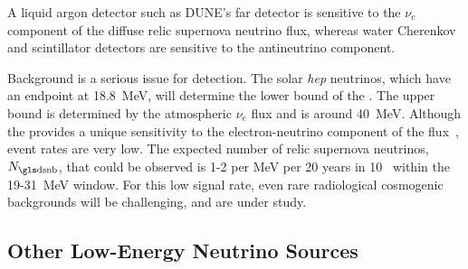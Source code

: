 A liquid argon detector such as DUNE's far detector is sensitive to
the $\nu_e$ component of the diffuse relic supernova neutrino flux,
whereas water Cherenkov and scintillator detectors are sensitive to
the antineutrino component.

Background is a serious issue for  detection.
The solar {\em hep} neutrinos, which have an                
endpoint at \SI{18.8}{\MeV}, will determine the lower bound of the .
The upper bound is determined
by the atmospheric ${\nu}_{e}$ flux and
is around \SI{40}{MeV}.
Although the  provides a unique sensitivity to the
electron-neutrino component of the 
flux~\cite{Cocco:2004ac}, event rates are very low.
%
The expected number of relic
supernova neutrinos, $N_{\rm \dword{dsnb}}$, that could be observed is
1-2 per MeV per 20 years in \SI{10}{\kt}~\cite{Moller2018kpm}
within the 19-31~MeV window.  For this low signal rate, even rare
radiological cosmogenic backgrounds will be challenging, and are
under study.


\subsection{Other Low-Energy Neutrino Sources}

